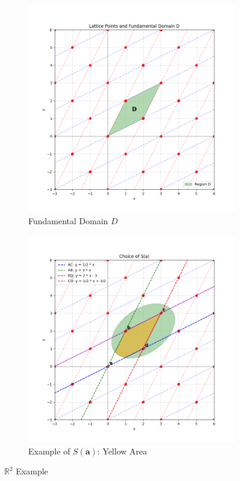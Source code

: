 \documentclass[11pt]{book}
\begin{document}
\begin{figure}[h]
    \centering
    \begin{subfigure}[b]{0.45\textwidth}
        \centering
        \includegraphics[width=\textwidth]{figures/Figure_1.png}
        \caption{Fundamental Domain \(D\)}
        \label{fig:first}
    \end{subfigure}
    \begin{subfigure}[b]{0.45\textwidth}
        \centering
        \includegraphics[width=\textwidth]{figures/Figure_2.png}
        \caption{Example of \(S(\mathbf{a})\): Yellow Area}
        \label{fig:second}
    \end{subfigure}
    \caption{\(\mathbb{R}^2\) Example}
    \label{fig:parallel_images}
\end{figure}
\end{document}

